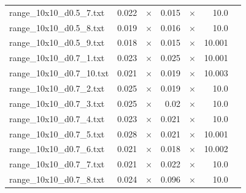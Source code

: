 \documentclass{article}
\begin{document}
\begin{center}
\begin{tabular}{lrrrrrr}
range\_10x10\_d0.5\_7.txt & 0.022 & 
$\times$
 & 0.015 & 
$\times$
 & 10.0 & 
\\
range\_10x10\_d0.5\_8.txt & 0.019 & 
$\times$
 & 0.016 & 
$\times$
 & 10.0 & 
\\
range\_10x10\_d0.5\_9.txt & 0.018 & 
$\times$
 & 0.015 & 
$\times$
 & 10.001 & 
\\
range\_10x10\_d0.7\_1.txt & 0.023 & 
$\times$
 & 0.025 & 
$\times$
 & 10.001 & 
\\
range\_10x10\_d0.7\_10.txt & 0.021 & 
$\times$
 & 0.019 & 
$\times$
 & 10.003 & 
\\
range\_10x10\_d0.7\_2.txt & 0.025 & 
$\times$
 & 0.019 & 
$\times$
 & 10.0 & 
\\
range\_10x10\_d0.7\_3.txt & 0.025 & 
$\times$
 & 0.02 & 
$\times$
 & 10.0 & 
\\
range\_10x10\_d0.7\_4.txt & 0.023 & 
$\times$
 & 0.021 & 
$\times$
 & 10.0 & 
\\
range\_10x10\_d0.7\_5.txt & 0.028 & 
$\times$
 & 0.021 & 
$\times$
 & 10.001 & 
\\
range\_10x10\_d0.7\_6.txt & 0.021 & 
$\times$
 & 0.018 & 
$\times$
 & 10.002 & 
\\
range\_10x10\_d0.7\_7.txt & 0.021 & 
$\times$
 & 0.022 & 
$\times$
 & 10.0 & 
\\
range\_10x10\_d0.7\_8.txt & 0.024 & 
$\times$
 & 0.096 & 
$\times$
 & 10.0 & 
\\
\hline\end{tabular}
\end{center}
\end{document}
